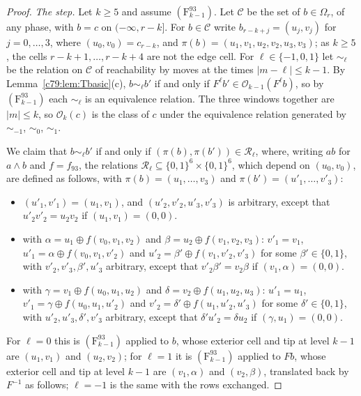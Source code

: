 \begin{proof}
\emph{The step.} Let $k\ge5$ and assume $(\mathrm F^{93}_{k-1})$. Let $\mathcal C$ be the set of $b\in\Omega_r$, of any phase, with $b=c$ on $(-\infty,r-k]$. For $b\in\mathcal C$ write $b_{r-k+j}=(u_j,v_j)$ for $j=0,\dots,3$, where $(u_0,v_0)=c_{r-k}$, and $\pi(b)=(u_1,v_1,u_2,v_2,u_3,v_3)$; as $k\ge5$, the cells $r-k+1,\dots,r-k+4$ are not the edge cell. For $\ell\in\{-1,0,1\}$ let $\sim_\ell$ be the relation on $\mathcal C$ of reachability by moves at the times $|m-\ell|\le k-1$. By Lemma~\ref{c79:lem:Tbasic}(c), $b\sim_\ell b'$ if and only if $F^\ell b'\in\mathcal O_{k-1}(F^\ell b)$, so by $(\mathrm F^{93}_{k-1})$ each $\sim_\ell$ is an equivalence relation. The three windows together are $|m|\le k$, so $\mathcal O_k(c)$ is the class of $c$ under the equivalence relation generated by $\sim_{-1}$, $\sim_0$, $\sim_1$.

We claim that $b\sim_\ell b'$ if and only if $(\pi(b),\pi(b'))\in\mathcal R_\ell$, where, writing $ab$ for $a\wedge b$ and $f=f_{93}$, the relations $\mathcal R_\ell\subseteq\{0,1\}^6\times\{0,1\}^6$, which depend on $(u_0,v_0)$, are defined as follows, with $\pi(b)=(u_1,\dots,v_3)$ and $\pi(b')=(u'_1,\dots,v'_3)$:
\begin{itemize}
\item[$\mathcal R_0$:] $(u'_1,v'_1)=(u_1,v_1)$, and $(u'_2,v'_2,u'_3,v'_3)$ is arbitrary, except that $u'_2v'_2=u_2v_2$ if $(u_1,v_1)=(0,0)$.
\item[$\mathcal R_1$:] with $\alpha=u_1\oplus f(v_0,v_1,v_2)$ and $\beta=u_2\oplus f(v_1,v_2,v_3)$: $v'_1=v_1$, $u'_1=\alpha\oplus f(v_0,v_1,v'_2)$ and $u'_2=\beta'\oplus f(v_1,v'_2,v'_3)$ for some $\beta'\in\{0,1\}$, with $v'_2,v'_3,\beta',u'_3$ arbitrary, except that $v'_2\beta'=v_2\beta$ if $(v_1,\alpha)=(0,0)$.
\item[$\mathcal R_{-1}$:] with $\gamma=v_1\oplus f(u_0,u_1,u_2)$ and $\delta=v_2\oplus f(u_1,u_2,u_3)$: $u'_1=u_1$, $v'_1=\gamma\oplus f(u_0,u_1,u'_2)$ and $v'_2=\delta'\oplus f(u_1,u'_2,u'_3)$ for some $\delta'\in\{0,1\}$, with $u'_2,u'_3,\delta',v'_3$ arbitrary, except that $\delta'u'_2=\delta u_2$ if $(\gamma,u_1)=(0,0)$.
\end{itemize}
For $\ell=0$ this is $(\mathrm F^{93}_{k-1})$ applied to $b$, whose exterior cell and tip at level $k-1$ are $(u_1,v_1)$ and $(u_2,v_2)$; for $\ell=1$ it is $(\mathrm F^{93}_{k-1})$ applied to $Fb$, whose exterior cell and tip at level $k-1$ are $(v_1,\alpha)$ and $(v_2,\beta)$, translated back by $F^{-1}$ as follows; $\ell=-1$ is the same with the rows exchanged.


\end{proof}

